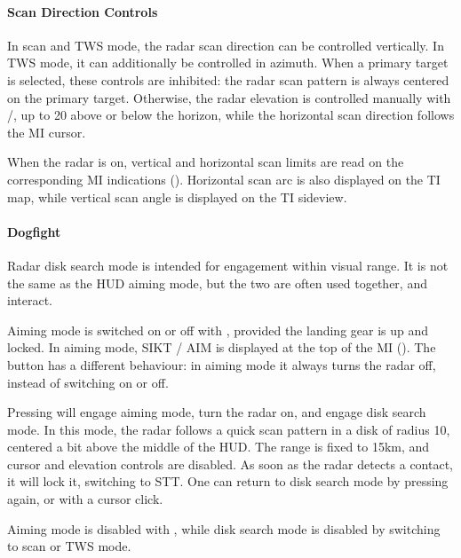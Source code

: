 \paragraph{Scan Direction Controls}
In scan and TWS mode, the radar scan direction can be controlled vertically.
In TWS mode, it can additionally be controlled in azimuth.
When a primary target is selected, these controls are inhibited:
the radar scan pattern is always centered on the primary target.
Otherwise, the radar elevation is controlled manually with \keys{<}/\keys{>},
up to 20\textdegree{} above or below the horizon,
while the horizontal scan direction follows the MI cursor.

When the radar is on, vertical and horizontal scan limits are read on
the corresponding MI indications ().
Horizontal scan arc is also displayed on the TI map,
while vertical scan angle is displayed on the TI sideview.

\paragraph{Dogfight}
Radar disk search mode is intended for engagement within visual range.
It is not the same as the HUD aiming mode, but the two are often used together, and interact.

Aiming mode is switched on or off with , provided the landing gear is up and locked.
In aiming mode, SIKT / AIM is displayed at the top of the MI ().
The button  has a different behaviour:
in aiming mode it always turns the radar off, instead of switching on or off.

Pressing  will engage aiming mode, turn the radar on, and engage disk search mode.
In this mode, the radar follows a quick scan pattern in a disk of radius 10\textdegree{},
centered a bit above the middle of the HUD.
The range is fixed to 15km, and cursor and elevation controls are disabled.
As soon as the radar detects a contact, it will lock it, switching to STT.
One can return to disk search mode by pressing  again, or with a cursor click.

Aiming mode is disabled with , while disk search mode is disabled by switching to scan or TWS mode.


